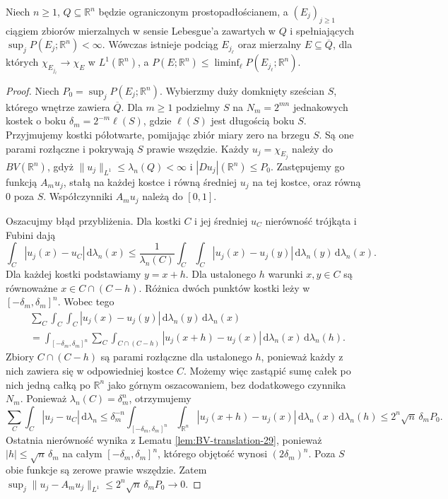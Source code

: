 \begin{twierdzenie}
\label{thm:perimeter-compact-29}
Niech $n\ge1$, $Q\subseteq\mathbb R^n$ będzie
ograniczonym prostopadłościanem, a $(E_j)_{j\ge1}$
ciągiem zbiorów mierzalnych w sensie Lebesgue'a
zawartych w $Q$ i spełniających
$\sup_j P(E_j;\mathbb R^n)<\infty$.
Wówczas istnieje podciąg $E_{j_\ell}$ oraz
mierzalny $E\subseteq\overline Q$, dla których
$\chi_{E_{j_\ell}}\to\chi_E$ w $L^1(\mathbb R^n)$,
a $P(E;\mathbb R^n)\le\liminf_\ell P(E_{j_\ell};\mathbb R^n)$.
\end{twierdzenie}
\begin{proof}
Niech $P_0=\sup_jP(E_j;\mathbb R^n)$.
Wybierzmy duży domknięty sześcian $S$, którego wnętrze
zawiera $\overline Q$. Dla $m\ge1$ podzielmy $S$
na $N_m=2^{mn}$ jednakowych kostek o boku
$\delta_m=2^{-m}\ell(S)$, gdzie $\ell(S)$ jest
długością boku $S$. Przyjmujemy kostki półotwarte,
pomijając zbiór miary zero na brzegu $S$.
Są one parami rozłączne i pokrywają $S$ prawie wszędzie.
Każdy $u_j=\chi_{E_j}$ należy do $BV(\mathbb R^n)$,
gdyż $\|u_j\|_{L^1}\le\lambda_n(Q)<\infty$ i
$|Du_j|(\mathbb R^n)\le P_0$. Zastępujemy go funkcją
$A_m u_j$, stałą na każdej kostce i równą
średniej $u_j$ na tej kostce, oraz równą $0$ poza $S$.
Współczynniki $A_m u_j$ należą do $[0,1]$.

Oszacujmy błąd przybliżenia. Dla kostki $C$
i jej średniej $u_C$ nierówność trójkąta i Fubini dają
\[
 \int_C|u_j(x)-u_C|\,\mathrm d\lambda_n(x)
 \le\frac1{\lambda_n(C)}\int_C\int_C
 |u_j(x)-u_j(y)|\,\mathrm d\lambda_n(y)
 \,\mathrm d\lambda_n(x).
\]
Dla każdej kostki podstawiamy $y=x+h$.
Dla ustalonego $h$ warunki $x,y\in C$ są równoważne
$x\in C\cap(C-h)$. Różnica dwóch punktów kostki
leży w $[-\delta_m,\delta_m]^n$. Wobec tego
\begin{align*}
 &\sum_C\int_C\int_C |u_j(x)-u_j(y)|
 \,\mathrm d\lambda_n(y)\,\mathrm d\lambda_n(x)\\
 &=\int_{[-\delta_m,\delta_m]^n}\sum_C
 \int_{C\cap(C-h)}|u_j(x+h)-u_j(x)|
 \,\mathrm d\lambda_n(x)\,\mathrm d\lambda_n(h).
\end{align*}
Zbiory $C\cap(C-h)$ są parami rozłączne dla
ustalonego $h$, ponieważ każdy z nich zawiera się
w odpowiedniej kostce $C$. Możemy więc zastąpić
sumę całek po nich jedną całką po $\mathbb R^n$
jako górnym oszacowaniem, bez dodatkowego czynnika
$N_m$. Ponieważ $\lambda_n(C)=\delta_m^n$,
otrzymujemy
\[
 \sum_C\int_C|u_j-u_C|\,\mathrm d\lambda_n
 \le\delta_m^{-n}\int_{[-\delta_m,\delta_m]^n}
 \int_{\mathbb R^n}|u_j(x+h)-u_j(x)|
 \,\mathrm d\lambda_n(x)\,\mathrm d\lambda_n(h)
 \le 2^n\sqrt n\,\delta_m P_0.
\]
Ostatnia nierówność wynika z Lematu
\ref{lem:BV-translation-29}, ponieważ $|h|\le\sqrt n\,\delta_m$
na całym $[-\delta_m,\delta_m]^n$, którego objętość
wynosi $(2\delta_m)^n$. Poza $S$ obie funkcje
są zerowe prawie wszędzie. Zatem
$\sup_j\|u_j-A_mu_j\|_{L^1}\le
2^n\sqrt n\,\delta_m P_0\to0$.


\end{proof}
